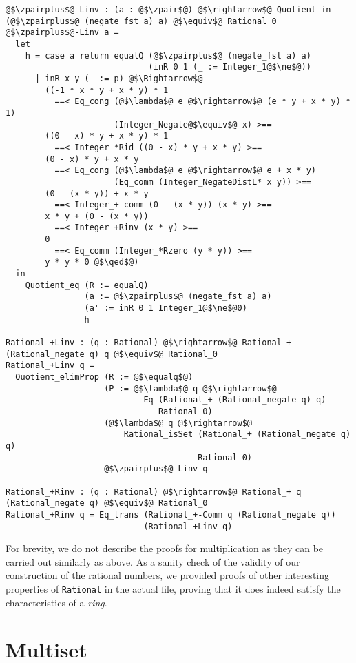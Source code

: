 \documentclass[12pt,twoside,maitrise]{dms}
\theoremstyle{definition}
\numberwithin{equation}{section}
\numberwithin{table}{chapter}
\numberwithin{figure}{chapter}
\newcommand\id[1] {\texttt{#1}}
\renewcommand\qed{\blacksquare}
\begin{document}
\begin{verbatim}
@$\zpairplus$@-Linv : (a : @$\zpair$@) @$\rightarrow$@ Quotient_in (@$\zpairplus$@ (negate_fst a) a) @$\equiv$@ Rational_0
@$\zpairplus$@-Linv a =
  let
    h = case a return equalQ (@$\zpairplus$@ (negate_fst a) a)
                             (inR 0 1 (_ := Integer_1@$\ne$@))
      | inR x y (_ := p) @$\Rightarrow$@
        ((-1 * x * y + x * y) * 1
          ==< Eq_cong (@$\lambda$@ e @$\rightarrow$@ (e * y + x * y) * 1)
                      (Integer_Negate@$\equiv$@ x) >==
        ((0 - x) * y + x * y) * 1
          ==< Integer_*Rid ((0 - x) * y + x * y) >==
        (0 - x) * y + x * y
          ==< Eq_cong (@$\lambda$@ e @$\rightarrow$@ e + x * y)
                      (Eq_comm (Integer_NegateDistL* x y)) >==
        (0 - (x * y)) + x * y
          ==< Integer_+-comm (0 - (x * y)) (x * y) >==
        x * y + (0 - (x * y))
          ==< Integer_+Rinv (x * y) >==
        0
          ==< Eq_comm (Integer_*Rzero (y * y)) >==
        y * y * 0 @$\qed$@)
  in
    Quotient_eq (R := equalQ)
                (a := @$\zpairplus$@ (negate_fst a) a)
                (a' := inR 0 1 Integer_1@$\ne$@0)
                h

Rational_+Linv : (q : Rational) @$\rightarrow$@ Rational_+ (Rational_negate q) q @$\equiv$@ Rational_0
Rational_+Linv q =
  Quotient_elimProp (R := @$\equalq$@)
                    (P := @$\lambda$@ q @$\rightarrow$@
                            Eq (Rational_+ (Rational_negate q) q)
                               Rational_0)
                    (@$\lambda$@ q @$\rightarrow$@
                        Rational_isSet (Rational_+ (Rational_negate q) q)
                                       Rational_0)
                    @$\zpairplus$@-Linv q

Rational_+Rinv : (q : Rational) @$\rightarrow$@ Rational_+ q (Rational_negate q) @$\equiv$@ Rational_0
Rational_+Rinv q = Eq_trans (Rational_+-Comm q (Rational_negate q))
                            (Rational_+Linv q)

\end{verbatim}

For brevity, we do not describe the proofs for multiplication as they can be
carried out similarly as above. As a sanity check of the validity of
our construction of the rational numbers, we provided proofs of other
interesting properties of \id{Rational} in the actual file, proving that it does
indeed satisfy the characteristics of a \emph{ring}.

\section{Multiset}\label{sec:multiset}
\end{document}
